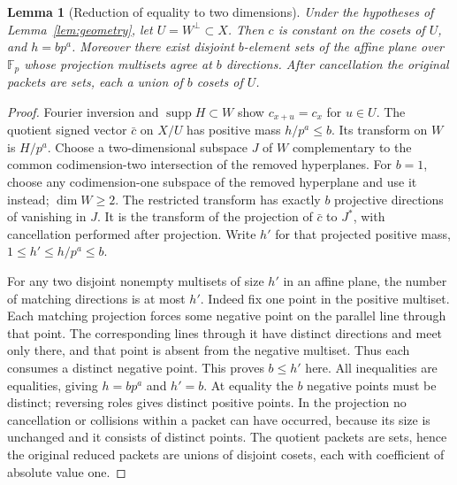 \documentclass[11pt]{article}
\newtheorem{lemma}[theorem]{Lemma}
\theoremstyle{remark}\newtheorem{remark}[theorem]{Remark}
\newcommand{\F}{\mathbb F}
\newcommand{\supp}{\operatorname{supp}}
\begin{document}
\begin{lemma}[Reduction of equality to two dimensions]\label{lem:plane}
Under the hypotheses of Lemma~\ref{lem:geometry}, let $U=W^\perp\subset X$. Then $c$ is constant on the cosets of $U$, and $h=bp^a$. Moreover there exist disjoint $b$-element sets of the affine plane over $\F_p$ whose projection multisets agree at $b$ directions. After cancellation the original packets are sets, each a union of $b$ cosets of $U$.
\end{lemma}
\begin{proof}
Fourier inversion and $\supp H\subset W$ show $c_{x+u}=c_x$ for $u\in U$. The quotient signed vector $\bar c$ on $X/U$ has positive mass $h/p^a\le b$. Its transform on $W$ is $H/p^a$. Choose a two-dimensional subspace $J$ of $W$ complementary to the common codimension-two intersection of the removed hyperplanes. For $b=1$, choose any codimension-one subspace of the removed hyperplane and use it instead; $\dim W\ge2$. The restricted transform has exactly $b$ projective directions of vanishing in $J$. It is the transform of the projection of $\bar c$ to $J^*$, with cancellation performed after projection. Write $h'$ for that projected positive mass, $1\le h'\le h/p^a\le b$.

For any two disjoint nonempty multisets of size $h'$ in an affine plane, the number of matching directions is at most $h'$. Indeed fix one point in the positive multiset. Each matching projection forces some negative point on the parallel line through that point. The corresponding lines through it have distinct directions and meet only there, and that point is absent from the negative multiset. Thus each consumes a distinct negative point. This proves $b\le h'$ here. All inequalities are equalities, giving $h=bp^a$ and $h'=b$. At equality the $b$ negative points must be distinct; reversing roles gives distinct positive points. In the projection no cancellation or collisions within a packet can have occurred, because its size is unchanged and it consists of distinct points. The quotient packets are sets, hence the original reduced packets are unions of disjoint cosets, each with coefficient of absolute value one.
\end{proof}
\end{document}
